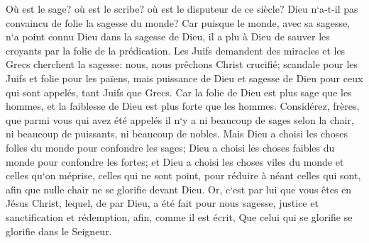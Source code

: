 \verse Où est le sage? où est le scribe? où est le disputeur de ce siècle? Dieu n`a-t-il pas convaincu de folie la sagesse du monde? 
\verse Car puisque le monde, avec sa sagesse, n`a point connu Dieu dans la sagesse de Dieu, il a plu à Dieu de sauver les croyants par la folie de la prédication. 
\verse Les Juifs demandent des miracles et les Grecs cherchent la sagesse: 
\verse nous, nous prêchons Christ crucifié; scandale pour les Juifs et folie pour les païens, 
\verse mais puissance de Dieu et sagesse de Dieu pour ceux qui sont appelés, tant Juifs que Grecs. 
\verse Car la folie de Dieu est plus sage que les hommes, et la faiblesse de Dieu est plus forte que les hommes. 
\verse Considérez, frères, que parmi vous qui avez été appelés il n`y a ni beaucoup de sages selon la chair, ni beaucoup de puissants, ni beaucoup de nobles. 
\verse Mais Dieu a choisi les choses folles du monde pour confondre les sages; Dieu a choisi les choses faibles du monde pour confondre les fortes; 
\verse et Dieu a choisi les choses viles du monde et celles qu`on méprise, celles qui ne sont point, pour réduire à néant celles qui sont, 
\verse afin que nulle chair ne se glorifie devant Dieu. 
\verse Or, c`est par lui que vous êtes en Jésus Christ, lequel, de par Dieu, a été fait pour nous sagesse, justice et sanctification et rédemption, 
\verse afin, comme il est écrit, Que celui qui se glorifie se glorifie dans le Seigneur. 

